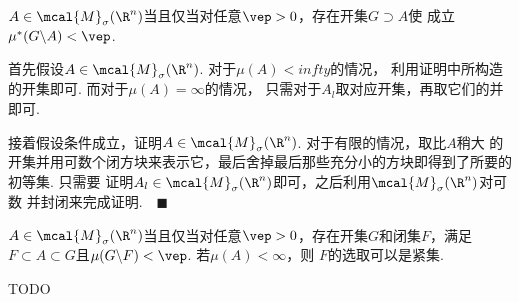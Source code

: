   \begin{thm}
    $A\in\mcal{M}_\sigma(\R^n)$当且仅当对任意$\vep>0$，存在开集$G\supset A$使
    成立$\mu^*(G\backslash A)<\vep$.
  \end{thm}
  \proof
    首先假设$A\in\mcal{M}_\sigma(\R^n)$. 对于$\mu(A)<infty$的情况，
    利用证明中所构造的开集即可. 而对于$\mu(A)=\infty$的情况，
    只需对于$A_l$取对应开集，再取它们的并即可.\par
    接着假设条件成立，证明$A\in\mcal{M}_\sigma(\R^n)$. 对于有限的情况，取比$A$稍大
    的开集并用可数个闭方块来表示它，最后舍掉最后那些充分小的方块即得到了所要的初等集. 只需要
    证明$A_l\in\mcal{M}_\sigma(\R^n)$即可，之后利用$\mcal{M}_\sigma(\R^n)$对可数
    并封闭来完成证明.$\quad\blacksquare$

  \begin{thm}
    $A\in\mcal{M}_\sigma(\R^n)$当且仅当对任意$\vep>0$，存在开集$G$和闭集$F$，满足
    $F\subset A\subset G$且$\mu(G\backslash F)<\vep$. 若$\mu(A)<\infty$，则
    $F$的选取可以是紧集.
  \end{thm}
  \proof
    TODO



